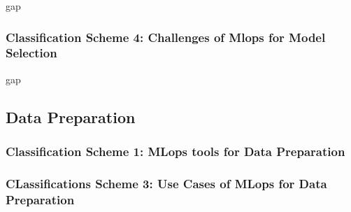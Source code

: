 gap

\subsubsection{Classification Scheme 4: Challenges of Mlops for Model Selection}

gap

\subsection{Data Preparation}

\subsubsection{Classification Scheme 1: MLops tools for Data Preparation}

\subsubsection{CLassifications Scheme 3: Use Cases of MLops for Data Preparation}
